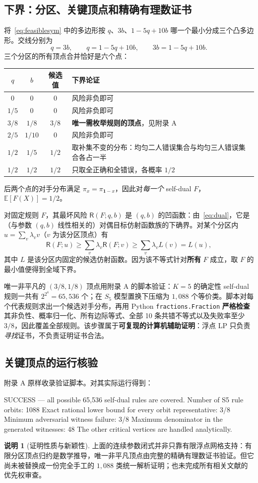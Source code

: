 \documentclass[11pt,a4paper]{ctexart}
\theoremstyle{definition}
\newtheorem{remark}[theorem]{说明}
\newcommand{\Risk}{\mathsf R}
\newcommand{\bbone}{\mathbf 1}
\newcommand{\E}{\mathbb E}
\begin{document}
\subsection{下界：分区、关键顶点和精确有理数证书}
将~\eqref{eq:feasiblesym} 中的多边形按 $q$、$3b$、$1-5q+10b$ 哪一个最小分成三个凸多边形。交线分别为
\[
q=3b,\qquad q=1-5q+10b,\qquad 3b=1-5q+10b.
\]
三个分区的所有顶点合并恰好是六个点：
\begin{center}
\begin{tabular}{@{}ccc p{6.9cm}@{}}
\toprule
$q$ & $b$ & 候选值 & 下界论证 \\
\midrule
$0$ & $0$ & $0$ & 风险非负即可 \\
$1/5$ & $0$ & $0$ & 风险非负即可 \\
$3/8$ & $1/8$ & $3/8$ & \textbf{唯一需枚举规则的顶点}，见附录 A \\
$2/5$ & $1/10$ & $0$ & 风险非负即可 \\
$1/2$ & $1/5$ & $1/2$ & 取补集不变的分布：均匀二人错误集合与均匀三人错误集合各占一半 \\
$1/2$ & $1/2$ & $1/2$ & 只取全正确和全错误，各概率 $1/2$ \\
\bottomrule
\end{tabular}
\end{center}
后两个点的对手分布满足 $\pi_x=\pi_{\bbone-x}$，因此对\emph{每一个} self-dual $F$，$\E[F(X)]=1/2$。

对固定规则 $F$，其最坏风险 $\Risk(F;q,b)$ 是 $(q,b)$ 的凹函数：由~\eqref{eq:dual}，它是（与参数 $(q,b)$ 线性相关的）对偶目标仿射函数族的下确界。对某个分区内 $u=\sum_v\lambda_vv$（$v$ 为该分区顶点）有
\[
\Risk(F;u)\ge\sum_v\lambda_v\Risk(F;v)
\ge\sum_v\lambda_v L(v)=L(u),
\]
其中 $L$ 是该分区内固定的候选仿射函数。因为该不等式针对\textbf{所有} $F$ 成立，取 $F$ 的最小值便得到全域下界。

唯一非平凡的 $(3/8,1/8)$ 顶点用附录 A 的脚本验证：$K=5$ 的确定性 self-dual 规则一共有 $2^{2^{4}}=65,536$ 个；在 $S_5$ 模型置换下压缩为 $1,088$ 个等价类。脚本对每个代表规则求出一个候选对手分布，再用 Python \texttt{fractions.Fraction} \textbf{严格检查}其非负性、概率归一化、所有边际等式、全部 10 条共错不等式以及失败率至少 $3/8$，因此覆盖全部规则。该步骤属于\textbf{可复现的计算机辅助证明}：浮点 LP 只负责\emph{寻找}证书，不负责证明证书合法。

\subsection{关键顶点的运行核验}
附录 A 原样收录验证脚本。对其实际运行得到：
\begin{CodeListing}
SUCCESS — all possible 65,536 self-dual rules are covered.
Number of S5 rule orbits: 1088
Exact rational lower bound for every orbit representative: 3/8
Minimum adversarial witness failure: 3/8
Maximum denominator in the generated witnesses: 48
The other critical vertices are handled analytically.
\end{CodeListing}
\begin{remark}[证明性质与新颖性]
上面的连续参数闭式并非只靠有限浮点网格支持：有限分区顶点归约是数学推导，唯一非平凡顶点由完整的精确有理数证书验证。但它尚未被替换成一份完全手工的 $1,088$ 类统一解析证明；也未完成所有相关文献的优先权审查。
\end{remark}
\end{document}
